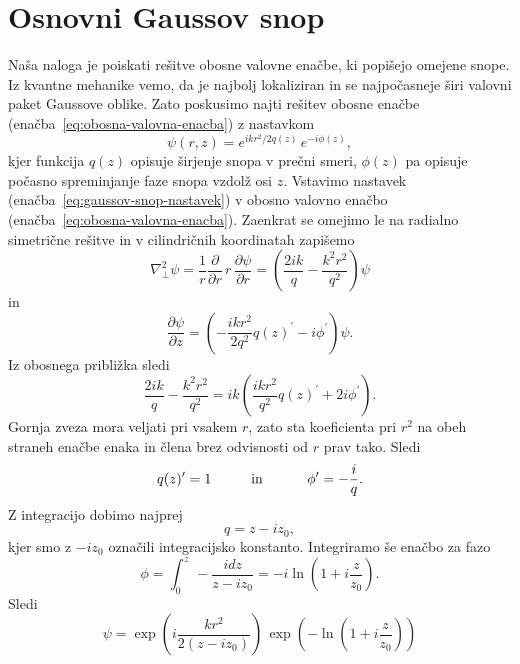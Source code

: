 \section{Osnovni Gaussov snop}
Naša naloga je poiskati rešitve obosne valovne enačbe, ki popišejo omejene
snope. Iz kvantne mehanike vemo, da je najbolj lokaliziran in se najpočasneje
širi valovni paket Gaussove oblike. Zato poskusimo najti rešitev obosne
enačbe (enačba~\ref{eq:obosna-valovna-enacba}) z nastavkom
\begin{equation}
\psi(r,z)=e^{ikr^{2}/2q(z)}\, e^{-i\phi(z)},\label{eq:gaussov-snop-nastavek}
\end{equation}
kjer funkcija $q(z)$ opisuje širjenje snopa v prečni smeri,
$\phi(z)$ pa opisuje počasno spreminjanje faze snopa vzdolž osi $z$.
Vstavimo nastavek (enačba~\ref{eq:gaussov-snop-nastavek}) v obosno valovno enačbo 
(enačba~\ref{eq:obosna-valovna-enacba}). Zaenkrat se omejimo le na radialno 
simetrične rešitve in v cilindričnih koordinatah zapišemo
\begin{equation}
\nabla_{\perp}^{2}\psi=\frac{1}{r}\frac{\partial}{\partial r}\, r\,\frac{\partial\psi}{\partial r}=
\left( \frac{2ik}{q}-\frac{k^2r^2}{q^2}\right)\psi
\end{equation}
 in 
\begin{equation}
\frac{\partial\psi}{\partial z}=\left(-\frac{ikr^{2}}{2q^2}q(z)^{\prime}-i\phi^{\prime}\right)\psi.
\end{equation}
Iz obosnega približka sledi
\begin{equation}
\frac{2ik}{q}-\frac{k^2r^2}{q^2}=ik\left(\frac{ikr^{2}}{q^2}q(z)^{\prime}+2i\phi^{\prime}\right).
\end{equation}
Gornja zveza mora veljati pri vsakem $r$, zato sta koeficienta
pri $r^{2}$ na obeh straneh enačbe enaka in člena brez odvisnosti od $r$ prav tako. Sledi
\begin{equation}
q(z)^{\prime}=1\mbox{\hskip1cm in \hskip1cm}\phi^{\prime}=-\frac{i}{q}.
\end{equation}
Z integracijo dobimo najprej 
\begin{equation}
q=z-iz_{0},
\label{eq:alpha}
\end{equation}
kjer smo z $-i z_{0}$ označili integracijsko konstanto. 
Integriramo še enačbo za fazo 
\begin{equation}
\phi=\int_{0}^{z}\,-\frac{i dz}{z-iz_{0}}=-i\ln(1+i\frac{z}{z_{0}}).
\end{equation}
Sledi
\begin{equation}
\psi = \exp\left(i\frac{kr^{2}}{2(z-iz_0)}\right)\,\exp\left(-\ln(1+i\frac{z}{z_{0}})\right)
\end{equation}
